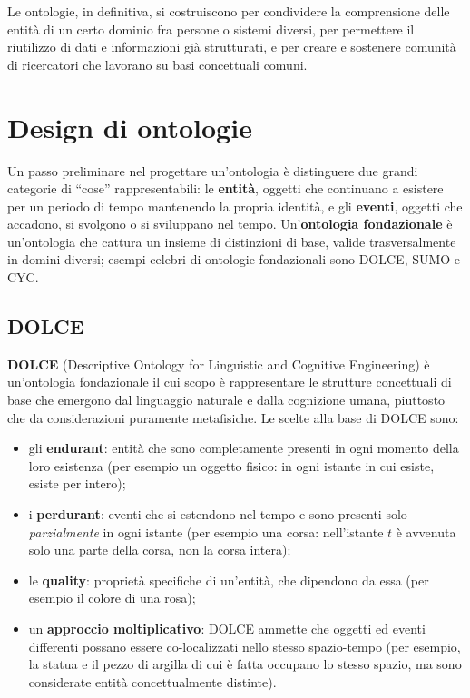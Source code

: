 \documentclass[11pt,a4paper]{report}
\begin{document}
Le ontologie, in definitiva, si costruiscono per condividere la comprensione delle entità di un certo dominio fra persone o sistemi diversi, per permettere il riutilizzo di dati e informazioni già strutturati, e per creare e sostenere comunità di ricercatori che lavorano su basi concettuali comuni.

\section{Design di ontologie}

Un passo preliminare nel progettare un'ontologia è distinguere due grandi categorie di ``cose'' rappresentabili: le \textbf{entità}, oggetti che continuano a esistere per un periodo di tempo mantenendo la propria identità, e gli \textbf{eventi}, oggetti che accadono, si svolgono o si sviluppano nel tempo. Un'\textbf{ontologia fondazionale} è un'ontologia che cattura un insieme di distinzioni di base, valide trasversalmente in domini diversi; esempi celebri di ontologie fondazionali sono DOLCE, SUMO e CYC.

\subsection{DOLCE}

\textbf{DOLCE} (Descriptive Ontology for Linguistic and Cognitive Engineering) è un'ontologia fondazionale il cui scopo è rappresentare le strutture concettuali di base che emergono dal linguaggio naturale e dalla cognizione umana, piuttosto che da considerazioni puramente metafisiche. Le scelte alla base di DOLCE sono:

\begin{itemize}
  \item gli \textbf{endurant}: entità che sono completamente presenti in ogni momento della loro esistenza (per esempio un oggetto fisico: in ogni istante in cui esiste, esiste per intero);
  \item i \textbf{perdurant}: eventi che si estendono nel tempo e sono presenti solo \emph{parzialmente} in ogni istante (per esempio una corsa: nell'istante $t$ è avvenuta solo una parte della corsa, non la corsa intera);
  \item le \textbf{quality}: proprietà specifiche di un'entità, che dipendono da essa (per esempio il colore di una rosa);
  \item un \textbf{approccio moltiplicativo}: DOLCE ammette che oggetti ed eventi differenti possano essere co-localizzati nello stesso spazio-tempo (per esempio, la statua e il pezzo di argilla di cui è fatta occupano lo stesso spazio, ma sono considerate entità concettualmente distinte).
\end{itemize}
\end{document}
